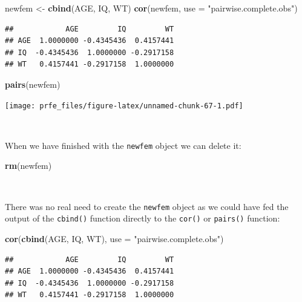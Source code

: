 \documentclass[12pt,a4paper]{book}
\newenvironment{Shaded}{\begin{snugshade}}{\end{snugshade}}
\newcommand{\KeywordTok}[1]{\textcolor[rgb]{0.13,0.29,0.53}{\textbf{#1}}}
\newcommand{\DataTypeTok}[1]{\textcolor[rgb]{0.13,0.29,0.53}{#1}}
\newcommand{\StringTok}[1]{\textcolor[rgb]{0.31,0.60,0.02}{#1}}
\newcommand{\NormalTok}[1]{#1}
\theoremstyle{definition}
\theoremstyle{definition}
\theoremstyle{definition}
\theoremstyle{remark}
\begin{document}
\begin{Shaded}
\begin{Highlighting}[]
\NormalTok{newfem <-}\StringTok{ }\KeywordTok{cbind}\NormalTok{(AGE, IQ, WT)}
\KeywordTok{cor}\NormalTok{(newfem, }\DataTypeTok{use =} \StringTok{"pairwise.complete.obs"}\NormalTok{)}
\end{Highlighting}
\end{Shaded}

\begin{verbatim}
##            AGE         IQ         WT
## AGE  1.0000000 -0.4345436  0.4157441
## IQ  -0.4345436  1.0000000 -0.2917158
## WT   0.4157441 -0.2917158  1.0000000
\end{verbatim}

\begin{Shaded}
\begin{Highlighting}[]
\KeywordTok{pairs}\NormalTok{(newfem)}
\end{Highlighting}
\end{Shaded}

\texttt{[image: prfe\_files/figure-latex/unnamed-chunk-67-1.pdf]}

~

When we have finished with the \texttt{newfem} object we can delete it:

\begin{Shaded}
\begin{Highlighting}[]
\KeywordTok{rm}\NormalTok{(newfem)}
\end{Highlighting}
\end{Shaded}

~

There was no real need to create the \texttt{newfem} object as we could
have fed the output of the \texttt{cbind()} function directly to the
\texttt{cor()} or \texttt{pairs()} function:

\begin{Shaded}
\begin{Highlighting}[]
\KeywordTok{cor}\NormalTok{(}\KeywordTok{cbind}\NormalTok{(AGE, IQ, WT), }\DataTypeTok{use =} \StringTok{"pairwise.complete.obs"}\NormalTok{)}
\end{Highlighting}
\end{Shaded}

\begin{verbatim}
##            AGE         IQ         WT
## AGE  1.0000000 -0.4345436  0.4157441
## IQ  -0.4345436  1.0000000 -0.2917158
## WT   0.4157441 -0.2917158  1.0000000
\end{verbatim}
\end{document}
